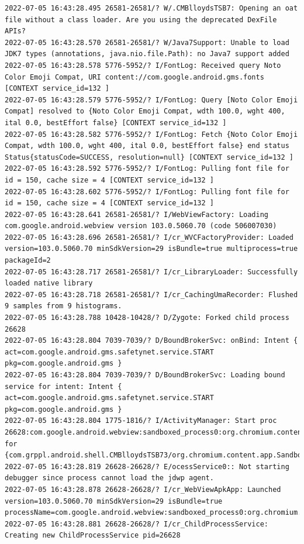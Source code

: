 \documentclass[a4paper,12pt]{book}
\begin{document}
\begin{lstlisting}
2022-07-05 16:43:28.495 26581-26581/? W/.CMBlloydsTSB7: Opening an oat file without a class loader. Are you using the deprecated DexFile APIs?
2022-07-05 16:43:28.570 26581-26581/? W/Java7Support: Unable to load JDK7 types (annotations, java.nio.file.Path): no Java7 support added
2022-07-05 16:43:28.578 5776-5952/? I/FontLog: Received query Noto Color Emoji Compat, URI content://com.google.android.gms.fonts [CONTEXT service_id=132 ]
2022-07-05 16:43:28.579 5776-5952/? I/FontLog: Query [Noto Color Emoji Compat] resolved to {Noto Color Emoji Compat, wdth 100.0, wght 400, ital 0.0, bestEffort false} [CONTEXT service_id=132 ]
2022-07-05 16:43:28.582 5776-5952/? I/FontLog: Fetch {Noto Color Emoji Compat, wdth 100.0, wght 400, ital 0.0, bestEffort false} end status Status{statusCode=SUCCESS, resolution=null} [CONTEXT service_id=132 ]
2022-07-05 16:43:28.592 5776-5952/? I/FontLog: Pulling font file for id = 150, cache size = 4 [CONTEXT service_id=132 ]
2022-07-05 16:43:28.602 5776-5952/? I/FontLog: Pulling font file for id = 150, cache size = 4 [CONTEXT service_id=132 ]
2022-07-05 16:43:28.641 26581-26581/? I/WebViewFactory: Loading com.google.android.webview version 103.0.5060.70 (code 506007030)
2022-07-05 16:43:28.696 26581-26581/? I/cr_WVCFactoryProvider: Loaded version=103.0.5060.70 minSdkVersion=29 isBundle=true multiprocess=true packageId=2
2022-07-05 16:43:28.717 26581-26581/? I/cr_LibraryLoader: Successfully loaded native library
2022-07-05 16:43:28.718 26581-26581/? I/cr_CachingUmaRecorder: Flushed 9 samples from 9 histograms.
2022-07-05 16:43:28.788 10428-10428/? D/Zygote: Forked child process 26628
2022-07-05 16:43:28.804 7039-7039/? D/BoundBrokerSvc: onBind: Intent { act=com.google.android.gms.safetynet.service.START pkg=com.google.android.gms }
2022-07-05 16:43:28.804 7039-7039/? D/BoundBrokerSvc: Loading bound service for intent: Intent { act=com.google.android.gms.safetynet.service.START pkg=com.google.android.gms }
2022-07-05 16:43:28.804 1775-1816/? I/ActivityManager: Start proc 26628:com.google.android.webview:sandboxed_process0:org.chromium.content.app.SandboxedProcessService0:0/u0i21 for  {com.grppl.android.shell.CMBlloydsTSB73/org.chromium.content.app.SandboxedProcessService0:0}
2022-07-05 16:43:28.819 26628-26628/? E/ocessService0:: Not starting debugger since process cannot load the jdwp agent.
2022-07-05 16:43:28.878 26628-26628/? I/cr_WebViewApkApp: Launched version=103.0.5060.70 minSdkVersion=29 isBundle=true processName=com.google.android.webview:sandboxed_process0:org.chromium.content.app.SandboxedProcessService0:0
2022-07-05 16:43:28.881 26628-26628/? I/cr_ChildProcessService: Creating new ChildProcessService pid=26628

\end{lstlisting}
\end{document}

